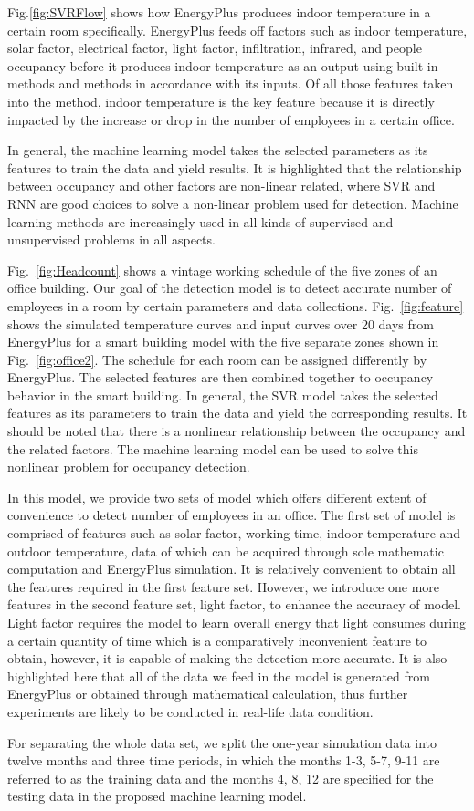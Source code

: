 Fig.\ref{fig:SVRFlow} shows how EnergyPlus produces indoor temperature
in a certain room specifically. EnergyPlus feeds off factors such as
indoor temperature, solar factor, electrical factor, light factor,
infiltration, infrared, and people occupancy before it produces indoor
temperature as an output using built-in methods and methods in
accordance with its inputs. Of all those features taken into the
method, indoor temperature is the key feature because it is directly
impacted by the increase or drop in the number of employees in a
certain office.

In general, the machine learning model takes the selected parameters
as its features to train the data and yield results. It is highlighted
that the relationship between occupancy and other factors are
non-linear related, where SVR and RNN are good choices to
solve a non-linear problem used for detection. Machine learning methods are
increasingly used in all kinds of supervised and unsupervised problems
in all aspects.

Fig.~\ref{fig:Headcount} shows a vintage working schedule of the five
zones of an office building. Our goal of the detection model is to
detect accurate number of employees in a room by certain parameters
and data collections. Fig.~\ref{fig:feature} shows the simulated
temperature curves and input curves over 20 days from EnergyPlus for a
smart building model with the five separate zones shown in
Fig.~\ref{fig:office2}. The schedule for each room can be assigned
differently by EnergyPlus. The selected features are then combined
together to occupancy behavior in the smart building. In general, the
SVR model takes the selected features as its parameters to train the
data and yield the corresponding results. It should be noted that
there is a nonlinear relationship between the occupancy and the
related factors. The machine learning model can be used to solve this
nonlinear problem for occupancy detection.

In this model, we provide two sets of model which offers different
extent of convenience to detect number of employees in an office. The
first set of model is comprised of features such as solar factor,
working time, indoor temperature and outdoor temperature, data of
which can be acquired through sole mathematic computation and
EnergyPlus simulation. It is relatively convenient to obtain all the
features required in the first feature set. However, we introduce one
more features in the second feature set, light factor, to enhance the
accuracy of model. Light factor requires the model to learn overall
energy that light consumes during a certain quantity of time which is
a comparatively inconvenient feature to obtain, however, it is capable
of making the detection more accurate. It is also highlighted here
that all of the data we feed in the model is generated from EnergyPlus
or obtained through mathematical calculation, thus further experiments
are likely to be conducted in real-life data condition.

For separating the whole data set, we split the one-year simulation
data into twelve months and three time periods, in which the months
1-3, 5-7, 9-11 are referred to as the training data and the months 4,
8, 12 are specified for the testing data in the proposed machine
learning model.
